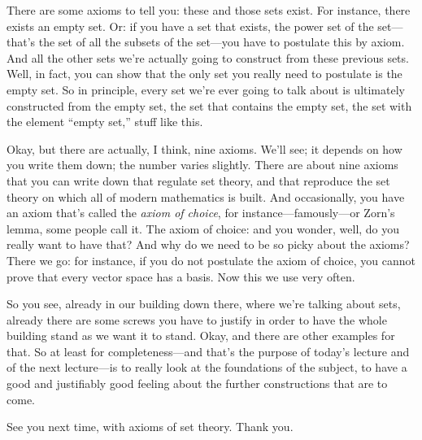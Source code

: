 There are some axioms to tell you: these and those sets exist. For instance, there exists an empty set. Or: if you have a set that exists, the power set of the set---that's the set of all the subsets of the set---you have to postulate this by axiom. And all the other sets we're actually going to construct from these previous sets. Well, in fact, you can show that the only set you really need to postulate is the empty set. So in principle, every set we're ever going to talk about is ultimately constructed from the empty set, the set that contains the empty set, the set with the element ``empty set,'' stuff like this.

Okay, but there are actually, I think, nine axioms. We'll see; it depends on how you write them down; the number varies slightly. There are about nine axioms that you can write down that regulate set theory, and that reproduce the set theory on which all of modern mathematics is built. And occasionally, you have an axiom that's called the \emph{axiom of choice}, for instance---famously---or Zorn's lemma, some people call it. The axiom of choice: and you wonder, well, do you really want to have that? And why do we need to be so picky about the axioms? There we go: for instance, if you do not postulate the axiom of choice, you cannot prove that every vector space has a basis. Now this we use very often.

So you see, already in our building down there, where we're talking about sets, already there are some screws you have to justify in order to have the whole building stand as we want it to stand. Okay, and there are other examples for that. So at least for completeness---and that's the purpose of today's lecture and of the next lecture---is to really look at the foundations of the subject, to have a good and justifiably good feeling about the further constructions that are to come.

See you next time, with axioms of set theory. Thank you.
